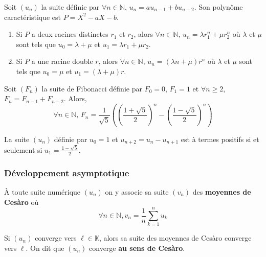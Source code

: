 	\begin{example}
		Soit $(u_n)$ la suite définie par $\forall n \in \mathbb{N}, \, u_n = a u_{n-1} + b u_{n-2}$. Son polynôme caractéristique est $P = X^2 - aX - b$.
		\begin{enumerate}
			\item Si $P$ a deux racines distinctes $r_1$ et $r_2$, alors $\forall n \in \mathbb{N}, \, u_n = \lambda r_1^n + \mu r_2^n$ où $\lambda$ et $\mu$ sont tels que $u_0 = \lambda + \mu$ et $u_1 = \lambda r_1 + \mu r_2$.
			\item Si $P$ a une racine double $r$, alors $\forall n \in \mathbb{N}, \, u_n = (\lambda n + \mu) r^n$ où $\lambda$ et $\mu$ sont tels que $u_0 = \mu$ et $u_1 = (\lambda + \mu) r$.
		\end{enumerate}
	\end{example}
	
	
	\begin{example}
		Soit $(F_n)$ la suite de Fibonacci définie par $F_0 = 0$, $F_1 = 1$ et $\forall n \geq 2$, $F_n = F_{n-1} + F_{n-2}$. Alors,
		\[ \forall n \in \mathbb{N}, \, F_n = \frac{1}{\sqrt{5}} \left ( \left ( \frac{1 + \sqrt{5}}{2} \right)^n - \left ( \frac{1 - \sqrt{5}}{2} \right)^n \right) \]
	\end{example}
	
	\begin{example}
		La suite $(u_n)$ définie par $u_0 = 1$ et $u_{n+2} = u_n - u_{n+1}$ est à termes positifs si et seulement si $u_1 = \frac{1 - \sqrt{5}}{2}$.
	\end{example}
	
	\subsubsection{Développement asymptotique}
	
	
	\begin{definition}
		À toute suite numérique $(u_n)$ on y associe sa suite $(v_n)$ des \textbf{moyennes de Cesàro} où
		\[ \forall n \in \mathbb{N}, v_n = \frac{1}{n} \sum_{k=1}^{n} u_k \]
	\end{definition}
	
	\begin{theorem}
		Si $(u_n)$ converge vers $\ell \in \mathbb{K}$, alors sa suite des moyennes de Cesàro converge vers $\ell$. On dit que $(u_n)$ converge \textbf{au sens de Cesàro}.
	\end{theorem}
	

